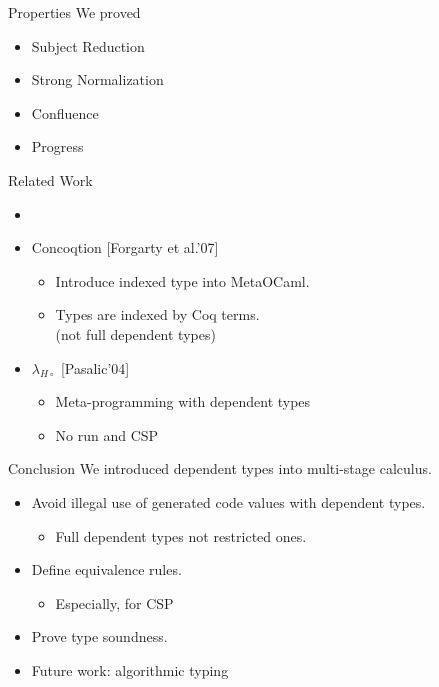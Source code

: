 \documentclass[dvipdfmx,aspectratio=169, 20pt]{beamer}
\begin{document}
\begin{frame}[fragile]{Properties}
    We proved
    \begin{itemize}
        \item Subject Reduction
        \item Strong Normalization
        \item Confluence
        \item Progress
    \end{itemize}
    \note{
    }
\end{frame}

\begin{frame}[fragile]{Related Work}
    \begin{itemize}
        \item {}
        \item Concoqtion [Forgarty et al.'07]
            \begin{itemize}
                \item Introduce indexed type into MetaOCaml.
                \item Types are indexed by Coq terms. \\ (not full dependent types)
            \end{itemize}
        \item \( \lambda_{H\circ} \) [Pasalic'04]
            \begin{itemize}
                \item Meta-programming with dependent types
                \item No run and CSP
            \end{itemize}
    \end{itemize}
    \note{
    }
\end{frame}

\begin{frame}[fragile]{Conclusion}
    We introduced dependent types into multi-stage calculus.
    \begin{itemize}
        \item Avoid illegal use of generated code values with dependent types.
            \begin{itemize}
                \item Full dependent types not restricted ones.
            \end{itemize}
        \item Define equivalence rules.
            \begin{itemize}
                \item Especially, for CSP
            \end{itemize}
        \item Prove type soundness.
        \item Future work: algorithmic typing
    \end{itemize}
    \note{
    }
\end{frame}
\end{document}
